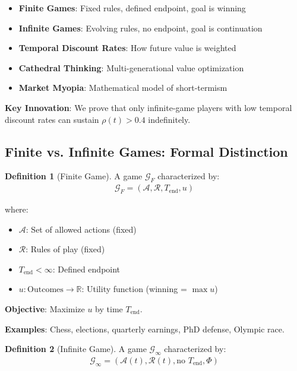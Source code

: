 \documentclass[11pt,a4paper]{article}
\theoremstyle{definition}
\newtheorem{definition}{Definition}[section]
\theoremstyle{remark}
\newcommand{\RR}{\mathbb{R}}
\begin{document}
\begin{small}
\begin{enumerate}
\begin{mdframed}[backgroundcolor=cyan!5,linewidth=2pt]
\begin{itemize}[nosep]
    \item \textbf{Finite Games}: Fixed rules, defined endpoint, goal is winning
    \item \textbf{Infinite Games}: Evolving rules, no endpoint, goal is continuation
    \item \textbf{Temporal Discount Rates}: How future value is weighted
    \item \textbf{Cathedral Thinking}: Multi-generational value optimization
    \item \textbf{Market Myopia}: Mathematical model of short-termism
\end{itemize}

\textbf{Key Innovation}: We prove that only infinite-game players with low temporal discount rates can sustain \(\rho(t) > 0.4\) indefinitely.
\end{mdframed}

\subsection{Finite vs. Infinite Games: Formal Distinction}

\begin{definition}[Finite Game]
A game \(\mathcal{G}_F\) characterized by:
\begin{align}
\mathcal{G}_F = (\mathcal{A}, \mathcal{R}, T_{\text{end}}, u)
\end{align}

where:
\begin{itemize}
    \item \(\mathcal{A}\): Set of allowed actions (fixed)
    \item \(\mathcal{R}\): Rules of play (fixed)
    \item \(T_{\text{end}} < \infty\): Defined endpoint
    \item \(u: \text{Outcomes} \to \RR\): Utility function (winning = \(\max u\))
\end{itemize}

\textbf{Objective}: Maximize \(u\) by time \(T_{\text{end}}\).

\textbf{Examples}: Chess, elections, quarterly earnings, PhD defense, Olympic race.
\end{definition}

\begin{definition}[Infinite Game]
A game \(\mathcal{G}_\infty\) characterized by:
\begin{align}
\mathcal{G}_\infty = (\mathcal{A}(t), \mathcal{R}(t), \text{no } T_{\text{end}}, \Phi)
\end{align}


\end{definition}
\end{enumerate}
\end{small}
\end{document}
